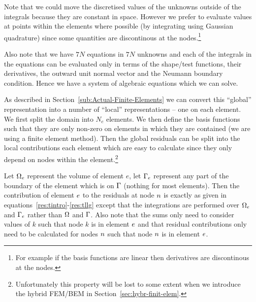 Note that we could move the discretised values of the unknowns outside of the integrals because they are constant in space. However we prefer to evaluate values at points within the elements where possible (by integrating using Gaussian quadrature) since some quantities are discontinous at the nodes.\footnote{For example if the basis functions are linear then derivatives are discontinous at the nodes.}

Also note that we have $7N$ equations in $7N$ unknowns and each of the integrals in the equations can be evaluated only in terms of the shape/test functions, their derivatives, the outward unit normal vector and the Neumann boundary condition. Hence we have a system of algebraic equations which we can solve.

As described in Section~\ref{sub:Actual-Finite-Elements} we can convert this ``global'' representation into a number of ``local'' representations -- one on each element. We first split the domain into $N_e$ elements. We then define the basis functions such that they are only non-zero on elements in which they are contained (\ie we are using a finite element method). Then the global residuals can be split into the local contributions each element which are easy to calculate since they only depend on nodes within the element.\footnote{Unfortunately this property will be lost to some extent when we introduce the hybrid FEM/BEM in Section~\ref{sec:hybr-finit-elem}.}

Let $\Omega_e$ represent the volume of element $e$, let ${\Gamma}_e$ represent any part of the boundary of the element which is on ${\Gamma}$ (nothing for most elements). Then the contribution of element $e$ to the residuals at node $n$ is exactly as given in equations~\eqref{res:tintro}-\eqref{res:tllg} except that the integrations are performed over $\Omega_e$ and ${\Gamma}_e$ rather than $\Omega$ and ${\Gamma}$. Also note that the sums only need to consider values of $k$ such that node $k$ is in element $e$ and that residual contributions only need to be calculated for nodes $n$ such that node $n$ is in element $e$.

